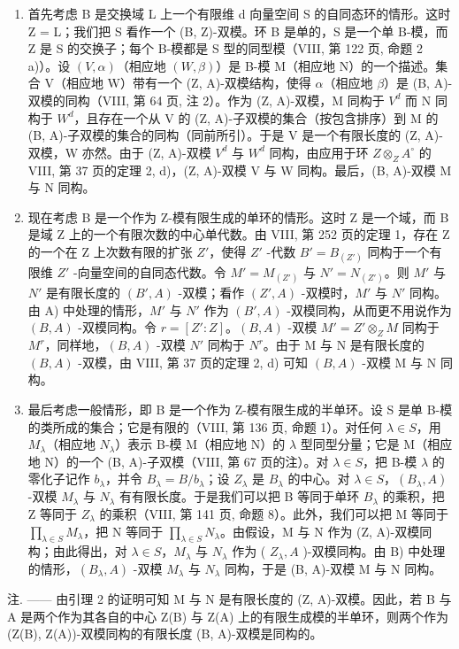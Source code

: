 \begin{enumerate}
\def\labelenumi{\Alph{enumi})}
\item
  首先考虑 B 是交换域 L 上一个有限维 d 向量空间 S 的自同态环的情形。这时 Z = L；我们把 S 看作一个 (B, Z)-双模。环 B 是单的，S 是一个单 B-模，而 Z 是 S 的交换子；每个 B-模都是 S 型的同型模（VIII, 第 122 页, 命题 2 a)）。设 \((V, \alpha)\)（相应地 \((W, \beta)\)）是 B-模 M（相应地 N）的一个描述。集合 V（相应地 W）带有一个 (Z, A)-双模结构，使得 \(\alpha\)（相应地 \(\beta\)）是 (B, A)-双模的同构（VIII, 第 64 页, 注 2）。作为 (Z, A)-双模，M 同构于 \(V^{d}\) 而 N 同构于 \(W^{d}\)，且存在一个从 V 的 (Z, A)-子双模的集合（按包含排序）到 M 的 (B, A)-子双模的集合的同构（同前所引）。于是 V 是一个有限长度的 (Z, A)-双模，W 亦然。由于 (Z, A)-双模 \(V^{d}\) 与 \(W^{d}\) 同构，由应用于环 \(Z \otimes_{Z} A^{\circ}\) 的 VIII, 第 37 页的定理 2, d)，(Z, A)-双模 V 与 W 同构。最后，(B, A)-双模 M 与 N 同构。
\item
  现在考虑 B 是一个作为 Z-模有限生成的单环的情形。这时 Z 是一个域，而 B 是域 Z 上的一个有限次数的中心单代数。由 VIII, 第 252 页的定理 1，存在 Z 的一个在 Z 上次数有限的扩张 \(Z'\)，使得 \(Z'\) -代数 \(B' = B_{(Z')}\) 同构于一个有限维 \(Z'\) -向量空间的自同态代数。令 \(M' = M_{(Z')}\) 与 \(N' = N_{(Z')}\)。则 \(M'\) 与 \(N'\) 是有限长度的 \((B', A)\) -双模；看作 \((Z', A)\) -双模时，\(M'\) 与 \(N'\) 同构。由 A) 中处理的情形，\(M'\) 与 \(N'\) 作为 \((B', A)\) -双模同构，从而更不用说作为 \((B, A)\) -双模同构。令 \(r = [Z' : Z]\)。\((B, A)\) -双模 \(M' = Z' \otimes_{Z} M\) 同构于 \(M^r\)，同样地，\((B, A)\) -双模 \(N'\) 同构于 \(N^r\)。由于 M 与 N 是有限长度的 \((B, A)\) -双模，由 VIII, 第 37 页的定理 2, d) 可知 \((B, A)\) -双模 M 与 N 同构。
\item
  最后考虑一般情形，即 B 是一个作为 Z-模有限生成的半单环。设 S 是单 B-模的类所成的集合；它是有限的（VIII, 第 136 页, 命题 1）。对任何 \(\lambda \in S\)，用 \(M_{\lambda}\)（相应地 \(N_{\lambda}\)）表示 B-模 M（相应地 N）的 \(\lambda\) 型同型分量；它是 M（相应地 N）的一个 (B, A)-子双模（VIII, 第 67 页的注）。对 \(\lambda \in S\)，把 B-模 \(\lambda\) 的零化子记作 \(b_{\lambda}\)，并令 \(B_{\lambda} = B / b_{\lambda}\)；设 \(Z_{\lambda}\) 是 \(B_{\lambda}\) 的中心。对 \(\lambda \in S\)，\((B_{\lambda}, A)\) -双模 \(M_{\lambda}\) 与 \(N_{\lambda}\) 有有限长度。于是我们可以把 B 等同于单环 \(B_{\lambda}\) 的乘积，把 Z 等同于 \(Z_{\lambda}\) 的乘积（VIII, 第 141 页, 命题 8）。此外，我们可以把 M 等同于 \(\prod_{\lambda \in S} M_{\lambda}\)，把 N 等同于 \(\prod_{\lambda \in S} N_{\lambda}\)。由假设，M 与 N 作为 (Z, A)-双模同构；由此得出，对 \(\lambda \in S\)，\(M_{\lambda}\) 与 \(N_{\lambda}\) 作为 ( \(Z_{\lambda}, A\) )-双模同构。由 B) 中处理的情形，\((B_{\lambda}, A)\) -双模 \(M_{\lambda}\) 与 \(N_{\lambda}\) 同构，于是 (B, A)-双模 M 与 N 同构。
\end{enumerate}

注. —— 由引理 2 的证明可知 M 与 N 是有限长度的 (Z, A)-双模。因此，若 B 与 A 是两个作为其各自的中心 Z(B) 与 Z(A) 上的有限生成模的半单环，则两个作为 (Z(B), Z(A))-双模同构的有限长度 (B, A)-双模是同构的。
